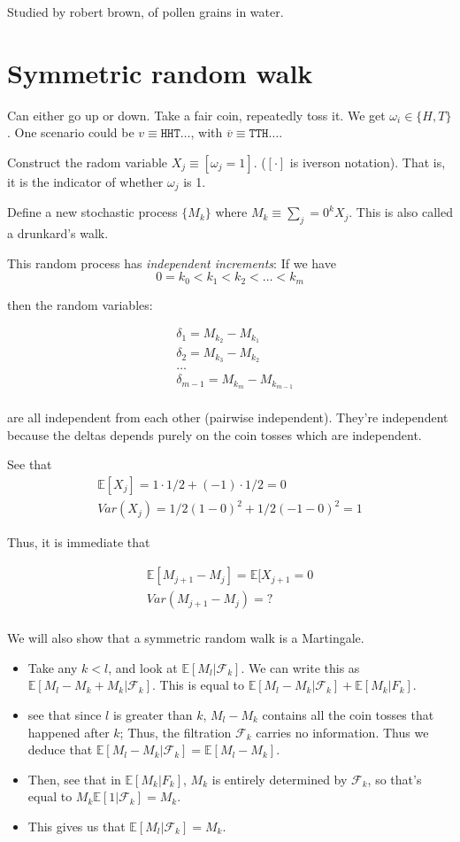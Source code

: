 \documentclass{book}
\newcommand{\F}{\ensuremath{\mathcal{F}}}
\newcommand{\E}{\ensuremath{\mathbb{E}}}
\theoremstyle{definition}
\begin{document}
Studied by robert brown, of pollen grains in water.

\section{Symmetric random walk}
Can either go up or down. Take a fair coin, repeatedly toss it. We get $\omega_i \in \{H, T\}$.
One scenario could be $v \equiv \texttt{HHT}\dots$, with $\overline v \equiv \texttt{TTH}\dots$.

Construct the radom variable $X_j \equiv [\omega_j = 1]$. ($[\cdot]$ is iverson notation). 
That is, it is the indicator of whether $\omega_j$ is 1.

Define a new stochastic process $\{ M_k \}$ where $M_k \equiv \sum_j=0^k X_j$.
This is also called a drunkard's walk.

This random process has \emph{independent increments}: If we have 
$$
0 = k_0 < k_1  < k_2 < \dots < k_m
$$

then the random variables:


\begin{align*}
& \delta_1 = M_{k_2} - M_{k_1} \\
& \delta_2 = M_{k_3} - M_{k_2} \\
& \dots \\
& \delta_{m-1} = M_{k_m} - M_{k_{m-1}} \\
\end{align*}

are all independent from each other (pairwise independent). They're independent
because the deltas depends purely on the coin tosses which are independent.

See that 
\begin{align*}
\E[X_j] = 1\cdot 1/2 + (-1) \cdot 1/2 = 0 \\
Var(X_j) = 1/2(1-0)^2 + 1/2(-1 - 0)^2 = 1
\end{align*}

Thus, it is immediate that 

\begin{align*}
\E[M_{j+1} - M_j] = \E[X_{j+1} = 0 \\
Var(M_{j+1} - M_j) = ? \\
\end{align*}

We will also show that a symmetric random walk is a Martingale.

\begin{itemize}
\item Take any $k < l$, and look at $\E[M_l | \F_k]$. We can write this as
$\E[M_l - M_k + M_k | \F_k]$.  This is equal to $\E[M_l - M_k| \F_k] +
\E[M_k|F_k]$.           
\item see that since $l$ is greater than $k$, $M_l - M_k$ contains all the coin tosses that happened
after $k$; Thus, the filtration $\F_k$ carries no information. Thus we deduce that
$\E[M_l - M_k|\F_k] = \E[M_l - M_k]$. 
\item Then, see that in $\E[M_k|F_k]$, $M_k$ is entirely determined by $\F_k$, so
  that's equal to $M_k \E[1 | \F_k] = M_k$.
\item This gives us that $\E[M_l|\F_k] = M_k$.
\end{itemize}
\end{document}
